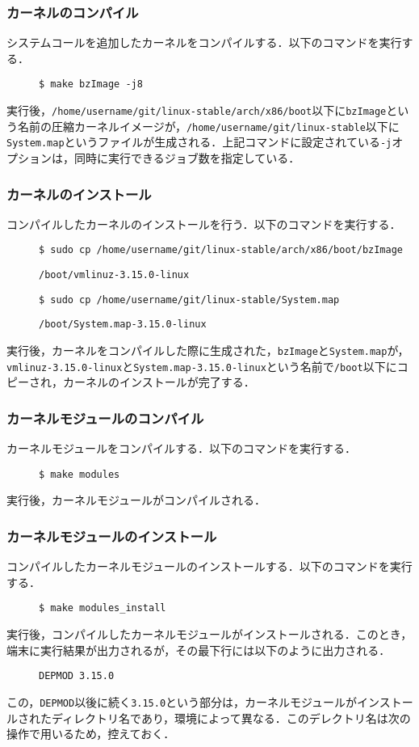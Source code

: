 \documentclass[12pt]{jsarticle}
\begin{document}
\subsubsection{カーネルのコンパイル}
システムコールを追加したカーネルをコンパイルする．以下のコマンドを実行する．
\begin{description}
\item[] \verb|$ make bzImage -j8|
\end{description}
実行後，\verb|/home/username/git/linux-stable/arch/x86/boot|以下に\verb|bzImage|という名前の圧縮カーネルイメージが，\verb|/home/username/git/linux-stable|以下に\verb|System.map|というファイルが生成される．上記コマンドに設定されている\verb|-j|オプションは，同時に実行できるジョブ数を指定している．
\subsubsection{カーネルのインストール}\label{kerin}
コンパイルしたカーネルのインストールを行う．以下のコマンドを実行する．
\begin{description}
\item[] \verb|$ sudo cp /home/username/git/linux-stable/arch/x86/boot/bzImage|
\item[] \verb|/boot/vmlinuz-3.15.0-linux|
\item[] \verb|$ sudo cp /home/username/git/linux-stable/System.map|
\item[] \verb|/boot/System.map-3.15.0-linux|
\end{description}
実行後，カーネルをコンパイルした際に生成された，\verb|bzImage|と\verb|System.map|が，\verb|vmlinuz-3.15.0-linux|と\verb|System.map-3.15.0-linux|という名前で\verb|/boot|以下にコピーされ，カーネルのインストールが完了する．
\subsubsection{カーネルモジュールのコンパイル}
カーネルモジュールをコンパイルする．以下のコマンドを実行する．
\begin{description}
\item[] \verb|$ make modules|
\end{description}
実行後，カーネルモジュールがコンパイルされる．
\subsubsection{カーネルモジュールのインストール}\label{kermin}
コンパイルしたカーネルモジュールのインストールする．以下のコマンドを実行する．
\begin{description}
\item[] \verb|$ make modules_install|
\end{description}
実行後，コンパイルしたカーネルモジュールがインストールされる．このとき，端末に実行結果が出力されるが，その最下行には以下のように出力される．
\begin{description}
\item[] \verb|DEPMOD 3.15.0|
\end{description}
この，\verb|DEPMOD|以後に続く\verb|3.15.0|という部分は，カーネルモジュールがインストールされたディレクトリ名であり，環境によって異なる．このデレクトリ名は次の操作で用いるため，控えておく．
\end{document}
